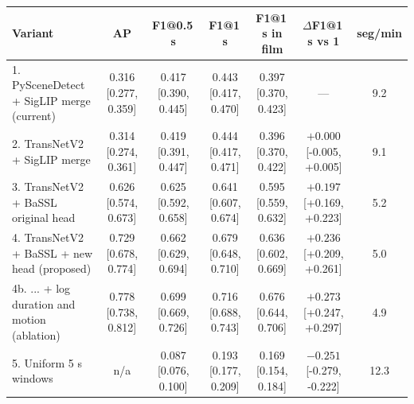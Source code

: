 \begin{tabular}{lcccccc}
\toprule
Variant & AP & F1@0.5\,s & F1@1\,s & F1@1\,s in film & $\Delta$F1@1\,s vs 1 & seg/min \\
\midrule
1. PySceneDetect + SigLIP merge (current) & 0.316 {\scriptsize[0.277, 0.359]} & 0.417 {\scriptsize[0.390, 0.445]} & 0.443 {\scriptsize[0.417, 0.470]} & 0.397 {\scriptsize[0.370, 0.423]} & --- & 9.2 \\
2. TransNetV2 + SigLIP merge & 0.314 {\scriptsize[0.274, 0.361]} & 0.419 {\scriptsize[0.391, 0.447]} & 0.444 {\scriptsize[0.417, 0.471]} & 0.396 {\scriptsize[0.370, 0.422]} & $+0.000$ {\scriptsize[-0.005, +0.005]} & 9.1 \\
3. TransNetV2 + BaSSL original head & 0.626 {\scriptsize[0.574, 0.673]} & 0.625 {\scriptsize[0.592, 0.658]} & 0.641 {\scriptsize[0.607, 0.674]} & 0.595 {\scriptsize[0.559, 0.632]} & $+0.197$ {\scriptsize[+0.169, +0.223]} & 5.2 \\
4. TransNetV2 + BaSSL + new head (proposed) & 0.729 {\scriptsize[0.678, 0.774]} & 0.662 {\scriptsize[0.629, 0.694]} & 0.679 {\scriptsize[0.648, 0.710]} & 0.636 {\scriptsize[0.602, 0.669]} & $+0.236$ {\scriptsize[+0.209, +0.261]} & 5.0 \\
4b. ... + log duration and motion (ablation) & 0.778 {\scriptsize[0.738, 0.812]} & 0.699 {\scriptsize[0.669, 0.726]} & 0.716 {\scriptsize[0.688, 0.743]} & 0.676 {\scriptsize[0.644, 0.706]} & $+0.273$ {\scriptsize[+0.247, +0.297]} & 4.9 \\
5. Uniform 5 s windows & n/a & 0.087 {\scriptsize[0.076, 0.100]} & 0.193 {\scriptsize[0.177, 0.209]} & 0.169 {\scriptsize[0.154, 0.184]} & $-0.251$ {\scriptsize[-0.279, -0.222]} & 12.3 \\
\bottomrule
\end{tabular}
